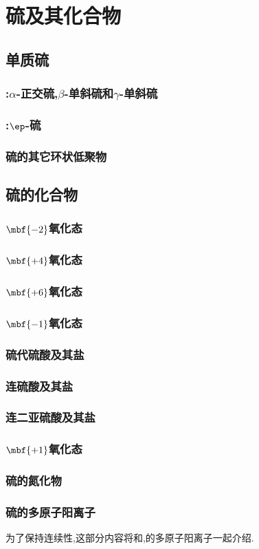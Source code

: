 \documentclass{ctexart}
\begin{document}
\section{硫及其化合物}
\subsection{单质硫}
\subsubsection{:$\alpha$-正交硫,$\beta$-单斜硫和$\gamma$-单斜硫}
\subsubsection{:$\ep$-硫}
\subsubsection{硫的其它环状低聚物}
\subsection{硫的化合物}
\subsubsection{$\mbf{-2}$氧化态}
\subsubsection{$\mbf{+4}$氧化态}
\subsubsection{$\mbf{+6}$氧化态}
\subsubsection{$\mbf{-1}$氧化态}
\subsubsection{硫代硫酸及其盐}
\subsubsection{连硫酸及其盐}
\subsubsection{连二亚硫酸及其盐}
\subsubsection{$\mbf{+1}$氧化态}
\subsubsection{硫的氮化物}
\subsubsection{硫的多原子阳离子}
为了保持连续性,这部分内容将和,的多原子阳离子一起介绍.
\end{document}
